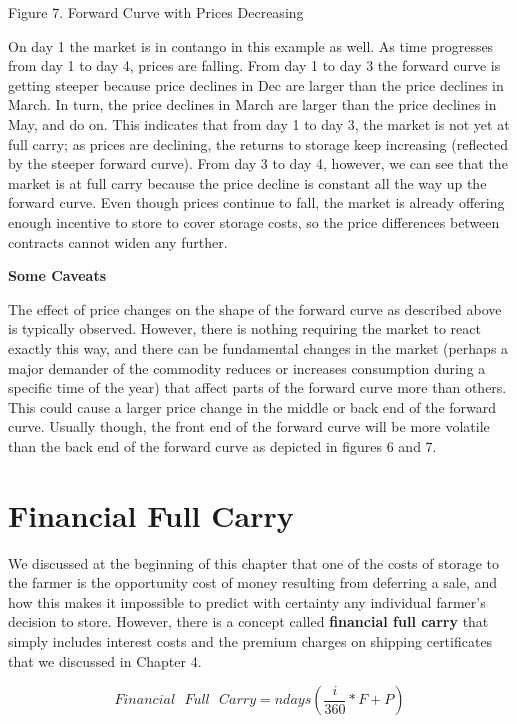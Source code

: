 \documentclass[
]{book}
\begin{document}
Figure 7. Forward Curve with Prices Decreasing

On day 1 the market is in contango in this example as well. As time progresses from day 1 to day 4, prices are falling. From day 1 to day 3 the forward curve is getting steeper because price declines in Dec are larger than the price declines in March. In turn, the price declines in March are larger than the price declines in May, and do on. This indicates that from day 1 to day 3, the market is not yet at full carry; as prices are declining, the returns to storage keep increasing (reflected by the steeper forward curve). From day 3 to day 4, however, we can see that the market is at full carry because the price decline is constant all the way up the forward curve. Even though prices continue to fall, the market is already offering enough incentive to store to cover storage costs, so the price differences between contracts cannot widen any further.

\textbf{Some Caveats}

The effect of price changes on the shape of the forward curve as described above is typically observed. However, there is nothing requiring the market to react exactly this way, and there can be fundamental changes in the market (perhaps a major demander of the commodity reduces or increases consumption during a specific time of the year) that affect parts of the forward curve more than others. This could cause a larger price change in the middle or back end of the forward curve. Usually though, the front end of the forward curve will be more volatile than the back end of the forward curve as depicted in figures 6 and 7.

\hypertarget{financial-full-carry}{%
\section{Financial Full Carry}\label{financial-full-carry}}

We discussed at the beginning of this chapter that one of the costs of storage to the farmer is the opportunity cost of money resulting from deferring a sale, and how this makes it impossible to predict with certainty any individual farmer's decision to store. However, there is a concept called \textbf{financial full carry} that simply includes interest costs and the premium charges on shipping certificates that we discussed in Chapter 4.

\[Financial \text{  } Full \text{  } Carry  = ndays(\frac{i}{360}*F + P)\]
\end{document}
